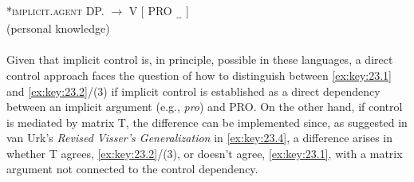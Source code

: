 \documentclass[output=paper]{langsci/langscibook}
\begin{document}
\ea\label{ex:key:23.3} *\textsc{implicit.agent}  DP.\Acc{} $\to$ \Nom{}  V  [\textsubscript{\Inf{}}  PRO \textsubscript{…}  ]\\
	\ea\label{ex:key:23.3a}  (personal knowledge)\\
    \ex\label{ex:key:23.3b}  \parencite[171, \eqref{ex:key:23.10b}]{vanUrk2013}\\
	\z
\z
%
Given that implicit control is, in principle, possible in these languages, a
direct control approach faces the question of how to distinguish between \eqref{ex:key:23.1}
and \eqref{ex:key:23.2}/(3) if implicit control is established as a direct dependency between
an implicit argument (e.g., \emph{pro}) and PRO. On the other hand, if
control is mediated by matrix T, the difference can be implemented since, as
suggested in van Urk’s \emph{Revised Visser’s Generalization} in \eqref{ex:key:23.4}, a
difference arises in whether T agrees, \eqref{ex:key:23.2}/(3), or doesn’t agree, \eqref{ex:key:23.1}, with a
matrix argument not connected to the control dependency.
\end{document}
